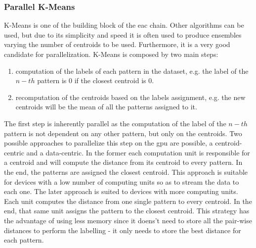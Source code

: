 



\subsubsection{Parallel K-Means}

K-Means is one of the building block of the \gls{eac} chain. Other algorithms can be used, but due to its simplicity and speed it is often used to produce ensembles varying the number of centroids to be used.
Furthermore, it is a very good candidate for parallelization. K-Means is composed by two main steps:

\begin{enumerate}
	\item computation of the labels of each pattern in the dataset, e.g. the label of the $n-th$ pattern is $0$ if the closest centroid is $0$.
	\item recomputation of the centroids based on the labels assignment, e.g. the new centroids will be the mean of all the patterns assigned to it.
\end{enumerate}

The first step is inherently parallel as the computation of the label of the $n-th$ pattern is not dependent on any other pattern, but only on the centroids. Two possible approaches to parallelize this step on the \gls{gpu} are possible, a centroid-centric and a data-centric. In the former each computation unit is responsible for a centroid and will compute the distance from its centroid to every pattern. In the end, the patterns are assigned the closest centroid. This approach is suitable for devices with a low number of computing units so as to stream the data to each one.
The later approach is suited to devices with more computing units. Each unit computes the distance from one single pattern to every centroid. In the end, that same unit assigns the pattern to the closest centroid. This strategy has the advantage of using less memory since it doens't need to store all the pair-wise distances to perform the labelling - it only needs to store the best distance for each pattern.


